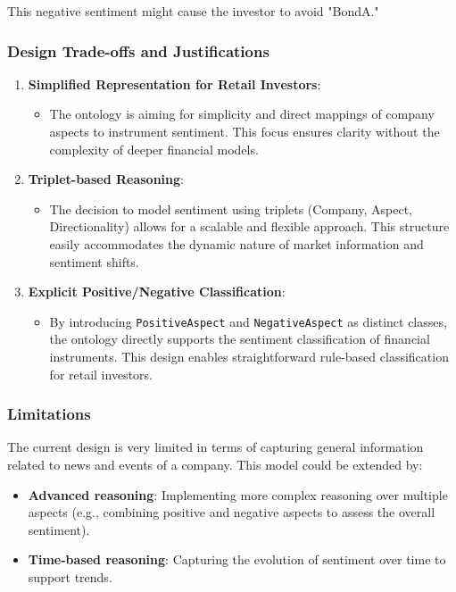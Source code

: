 \documentclass[
]{article}
\begin{document}
This negative sentiment might cause the investor to avoid "BondA."

\subsubsection{Design Trade-offs and
Justifications}\label{design-trade-offs-and-justifications}

\begin{enumerate}
\def\labelenumi{\arabic{enumi}.}
\item
  \textbf{Simplified Representation for Retail Investors}:

  \begin{itemize}
  \item
    The ontology is aiming for simplicity and direct mappings of company
    aspects to instrument sentiment. This focus ensures clarity without
    the complexity of deeper financial models.
  \end{itemize}
\item
  \textbf{Triplet-based Reasoning}:

  \begin{itemize}
  \item
    The decision to model sentiment using triplets (Company, Aspect,
    Directionality) allows for a scalable and flexible approach. This
    structure easily accommodates the dynamic nature of market
    information and sentiment shifts.
  \end{itemize}
\item
  \textbf{Explicit Positive/Negative Classification}:

  \begin{itemize}
  \item
    By introducing \texttt{PositiveAspect} and \texttt{NegativeAspect}
    as distinct classes, the ontology directly supports the sentiment
    classification of financial instruments. This design enables
    straightforward rule-based classification for retail investors.
  \end{itemize}
\end{enumerate}

\subsubsection{Limitations}\label{limitations}

The current design is very limited in terms of capturing general
information related to news and events of a company. This model could be
extended by:

\begin{itemize}
\item
  \textbf{Advanced reasoning}: Implementing more complex reasoning over
  multiple aspects (e.g., combining positive and negative aspects to
  assess the overall sentiment).
\item
  \textbf{Time-based reasoning}: Capturing the evolution of sentiment
  over time to support trends.
\end{itemize}
\end{document}
